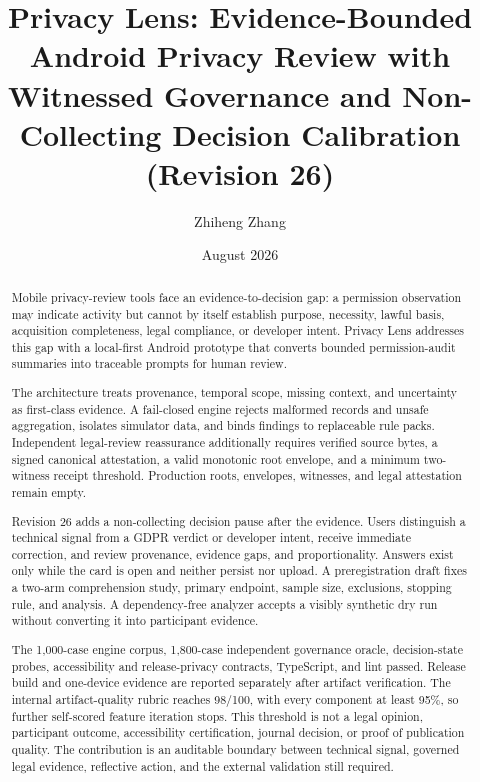 \documentclass[11pt,a4paper]{article}
\title{Privacy Lens: Evidence-Bounded Android Privacy Review with Witnessed Governance and Non-Collecting Decision Calibration (Revision 26)}
\author{Zhiheng Zhang}
\date{August 2026}
\begin{document}
\maketitle
\begin{abstract}
\small\singlespacing
Mobile privacy-review tools face an evidence-to-decision gap: a permission observation may indicate activity but cannot by itself establish purpose, necessity, lawful basis, acquisition completeness, legal compliance, or developer intent. Privacy Lens addresses this gap with a local-first Android prototype that converts bounded permission-audit summaries into traceable prompts for human review.

The architecture treats provenance, temporal scope, missing context, and uncertainty as first-class evidence. A fail-closed engine rejects malformed records and unsafe aggregation, isolates simulator data, and binds findings to replaceable rule packs. Independent legal-review reassurance additionally requires verified source bytes, a signed canonical attestation, a valid monotonic root envelope, and a minimum two-witness receipt threshold. Production roots, envelopes, witnesses, and legal attestation remain empty.

Revision 26 adds a non-collecting decision pause after the evidence. Users distinguish a technical signal from a GDPR verdict or developer intent, receive immediate correction, and review provenance, evidence gaps, and proportionality. Answers exist only while the card is open and neither persist nor upload. A preregistration draft fixes a two-arm comprehension study, primary endpoint, sample size, exclusions, stopping rule, and analysis. A dependency-free analyzer accepts a visibly synthetic dry run without converting it into participant evidence.

The 1,000-case engine corpus, 1,800-case independent governance oracle, decision-state probes, accessibility and release-privacy contracts, TypeScript, and lint passed. Release build and one-device evidence are reported separately after artifact verification. The internal artifact-quality rubric reaches 98/100, with every component at least 95\%, so further self-scored feature iteration stops. This threshold is not a legal opinion, participant outcome, accessibility certification, journal decision, or proof of publication quality. The contribution is an auditable boundary between technical signal, governed legal evidence, reflective action, and the external validation still required.
\end{abstract}
\newpage
\tableofcontents
\newpage







{\small


}
\end{document}

